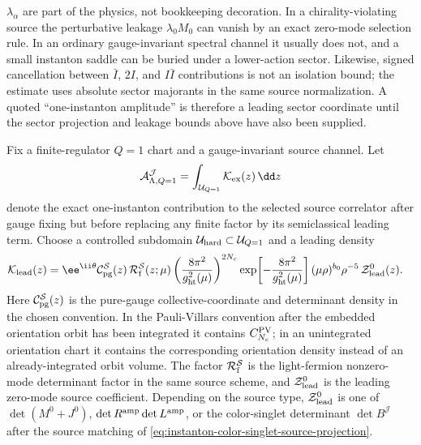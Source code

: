 \begin{controlledapproximation}
\(\lambda_\alpha\) are part of the physics, not bookkeeping decoration.  In a
chirality-violating source the perturbative leakage \(\lambda_0M_0\) can
vanish by an exact zero-mode selection rule.  In an ordinary gauge-invariant
spectral channel it usually does not, and a small instanton saddle can be
buried under a lower-action sector.  Likewise, signed cancellation between
\(\bar I\), \(2I\), and \(I\bar I\) contributions is not an isolation
bound; the estimate uses absolute sector majorants in the same source
normalization.  A quoted ``one-instanton amplitude'' is therefore a leading
sector coordinate until the sector projection and leakage bounds above have
also been supplied.
\end{controlledapproximation}

\begin{proposition}
\label{prop:instanton-amplitude-assembly-error-budget}
Fix a finite-regulator \(Q=1\) chart and a gauge-invariant source channel.
Let
\begin{equation}
  \mathcal A_{\Lambda,Q=1}^{\mathcal J}
  =
  \int_{\mathcal U_{Q=1}}
  \mathcal K_{\rm ex}(z)\,\dd z
  \label{eq:instanton-exact-source-amplitude-density}
\end{equation}
denote the exact one-instanton contribution to the selected source
correlator after gauge fixing but before replacing any finite factor by its
semiclassical leading term.  Choose a controlled subdomain
\(\mathcal U_{\rm hard}\subset\mathcal U_{Q=1}\) and a leading density
\begin{equation}
\begin{aligned}
  \mathcal K_{\rm lead}(z)
  &=
  \ee^{\ii\theta}
  \mathcal C_{\rm pg}^{\mathcal S}(z)\,
  \mathcal R_{\rm f}^{\mathcal S}(z;\mu)
  \left(\frac{8\pi^2}{g_{\rm ht}^2(\mu)}\right)^{2N_c}
  \exp\!\left[-\frac{8\pi^2}{g_{\rm ht}^2(\mu)}\right]
  (\mu\rho)^{b_0}\rho^{-5}\,
  \mathcal Z_{\rm lead}^{0}(z).
\end{aligned}
  \label{eq:instanton-leading-amplitude-density}
\end{equation}
Here \(\mathcal C_{\rm pg}^{\mathcal S}(z)\) is the pure-gauge
collective-coordinate and determinant density in the chosen convention.  In
the Pauli-Villars convention after the embedded orientation orbit has been
integrated it contains \(C_{N_c}^{\rm PV}\); in an unintegrated orientation
chart it contains the corresponding orientation density instead of an
already-integrated orbit volume.  The factor
\(\mathcal R_{\rm f}^{\mathcal S}\) is the light-fermion nonzero-mode
determinant factor in the same source scheme, and
\(\mathcal Z_{\rm lead}^{0}\) is the leading zero-mode source coefficient.
Depending on the source type,
\(\mathcal Z_{\rm lead}^{0}\) is one of
\(\det(M^0+J^0)\), \(\det R^{\rm amp}\det L^{\rm amp}\), or the
color-singlet determinant \(\det B^{\mathcal J}\) after the source matching
of \eqref{eq:instanton-color-singlet-source-projection}.


\end{proposition}
